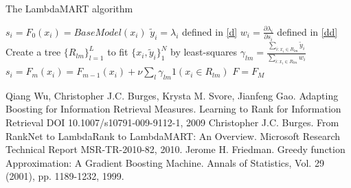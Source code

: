 \documentclass [11pt,a4paper]{article}
\begin{document}
\begin{algorithm}
\caption{The LambdaMART algorithm}
{
  $s_i = F_0(x_i) = BaseModel(x_i)$\;
}
{
  {
    $\widetilde{y}_i = \lambda_i$ defined in \ref{d}\;
    $w_i = \frac{\partial \lambda_i}{\partial s_i}$ defined in \ref{dd}\;
  }
  Create a tree $\{R_{lm}\}_{l=1}^L$ to fit $\{x_i, \widetilde{y}_i\}_1^N$ by least-squares\;
  {
    $\gamma_{lm} = \frac
      {\sum_{i:x_i \in R_{lm}} \widetilde{y}_i}
      {\sum_{i:x_i \in R_{lm}} w_i}$\;
  }
  {
    $s_i = F_m(x_i) = F_{m-1}(x_i) + \nu \sum_l \gamma_{lm}1 (x_i \in R_{lm})$\;
  }
}
$F = F_M$\;
\end{algorithm}


\newpage


\begin{thebibliography}{}
Qiang Wu, Christopher J.C. Burges, Krysta M. Svore, Jianfeng Gao.
Adapting Boosting for Information Retrieval Measures.
Learning to Rank for Information Retrieval DOI 10.1007/s10791-009-9112-1, 2009
Christopher J.C. Burges.
From RankNet to LambdaRank to LambdaMART: An Overview.
Microsoft Research Technical Report MSR-TR-2010-82, 2010.
Jerome H. Friedman.
Greedy function Approximation: A Gradient Boosting Machine.
Annals of Statistics, Vol. 29 (2001), pp. 1189-1232, 1999.
\end{thebibliography}
\end{document}
